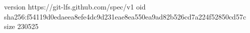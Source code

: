 version https://git-lfs.github.com/spec/v1
oid sha256:f54119d0edaeea8efe4dc9d231eae8ea550ea9ad82b526cd7a224f52850cd57c
size 230525
